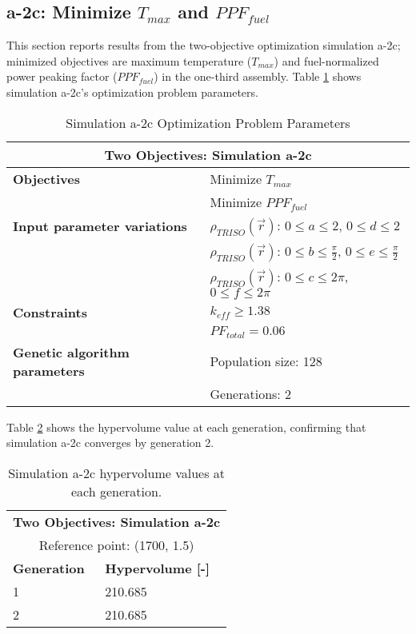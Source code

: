 \subsection{a-2c: Minimize $T_{max}$ and $PPF_{fuel}$}
\label{sec:a-2c}
This section reports results from the two-objective optimization simulation a-2c; 
minimized objectives are maximum temperature ($T_{max}$) and fuel-normalized power 
peaking factor ($PPF_{fuel}$) in the one-third assembly.  
Table \ref{tab:simulationa2c} shows simulation a-2c's optimization problem parameters. 
\begin{table}[htbp!]
    \centering
    \onehalfspacing
    \caption{Simulation a-2c Optimization Problem Parameters}
	\label{tab:simulationa2c}
    \footnotesize
    \begin{tabular}{l|p{5.3cm}}
    \hline 
    \multicolumn{2}{c}{\textbf{Two Objectives: Simulation a-2c}} \\
    \hline 
    \textbf{Objectives} & Minimize $T_{max}$ \\
    & Minimize $PPF_{fuel}$ \\
    \hline 
    \textbf{Input parameter variations}
    & $\rho_{TRISO}(\vec{r})$: $0 \leq a \leq 2$, $0 \leq d \leq 2$\\
    & $\rho_{TRISO}(\vec{r})$: $0 \leq b \leq \frac{\pi}{2}$, $0 \leq e \leq \frac{\pi}{2}$\\
    & $\rho_{TRISO}(\vec{r})$: $0 \leq c \leq 2\pi$, $0 \leq f \leq 2\pi$\\
    \hline
    \textbf{Constraints} & $k_{eff} \geq 1.38$\\ 
    & $PF_{total} = 0.06$\\
    \hline 
    \textbf{Genetic algorithm parameters} & Population size: 128 \\
    & Generations: 2 \\
    \hline
    \end{tabular}
\end{table}

Table \ref{tab:a2c-hypervolume} shows the hypervolume value at each generation, 
confirming that simulation a-2c converges by generation 2. 
\begin{table}[htbp!]
    \centering
    \onehalfspacing
    \caption{Simulation a-2c hypervolume values at each generation.}
	\label{tab:a2c-hypervolume}
    \footnotesize
    \begin{tabular}{ll}
    \hline 
    \multicolumn{2}{c}{\textbf{Two Objectives: Simulation a-2c}} \\
    \multicolumn{2}{c}{Reference point: (1700, 1.5)} \\
    \hline 
    \textbf{Generation} & \textbf{Hypervolume [-]} \\
    \hline
    1 & 210.685 \\
    2 & 210.685 \\
    \hline
    \end{tabular}
\end{table}

